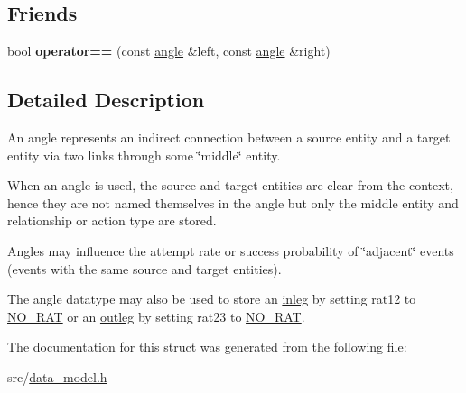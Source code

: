 \subsection*{Friends}
\begin{DoxyCompactItemize}
\item 
\mbox{\label{structtricl_1_1angle_a08af3ce953cf2a9246fc60278c929a52}} 
bool {\bfseries operator==} (const \hyperlink{structtricl_1_1angle}{angle} \&left, const \hyperlink{structtricl_1_1angle}{angle} \&right)
\end{DoxyCompactItemize}


\subsection{Detailed Description}
An angle represents an indirect connection between a source entity and a target entity via two links through some \char`\"{}middle\char`\"{} entity. 

When an angle is used, the source and target entities are clear from the context, hence they are not named themselves in the angle but only the middle entity and relationship or action type are stored.

Angles may influence the attempt rate or success probability of \char`\"{}adjacent\char`\"{} events (events with the same source and target entities).

The {\ttfamily angle} datatype may also be used to store an \hyperlink{structtricl_1_1inleg}{inleg} by setting {\ttfamily rat12} to \hyperlink{data__model_8h_ae71ff63a5bdb6bfc09a18840c8df4e54}{N\+O\+\_\+\+R\+AT} or an \hyperlink{structtricl_1_1outleg}{outleg} by setting {\ttfamily rat23} to \hyperlink{data__model_8h_ae71ff63a5bdb6bfc09a18840c8df4e54}{N\+O\+\_\+\+R\+AT}. 

The documentation for this struct was generated from the following file\+:\begin{DoxyCompactItemize}
\item 
src/\hyperlink{data__model_8h}{data\+\_\+model.\+h}\end{DoxyCompactItemize}
